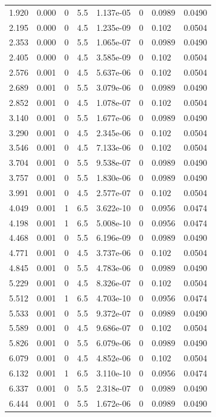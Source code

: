 \documentclass[preview]{standalone}
\begin{document}
{{\begin{tabular}{L{1.2cm}C{1.2cm} C{0.3cm}C{0.5cm} C{1.4cm}C{1.4cm} C{1.4cm}C{1.4cm}}
  1.920  &  0.000  & 0     & 5.5 &  1.137e-05  & 0  & 0.0989 &  0.0490   \\ 
  2.195  &  0.000  & 0     & 4.5 &  1.235e-09  & 0  & 0.102 &  0.0504   \\ 
  2.353  &  0.000  & 0     & 5.5 &  1.065e-07  & 0  & 0.0989 &  0.0490   \\ 
  2.405  &  0.000  & 0     & 4.5 &  3.585e-09  & 0  & 0.102 &  0.0504   \\ 
  2.576  &  0.001  & 0     & 4.5 &  5.637e-06  & 0  & 0.102 &  0.0504   \\ 
  2.689  &  0.001  & 0     & 5.5 &  3.079e-06  & 0  & 0.0989 &  0.0490   \\ 
  2.852  &  0.001  & 0     & 4.5 &  1.078e-07  & 0  & 0.102 &  0.0504   \\ 
  3.140  &  0.001  & 0     & 5.5 &  1.677e-06  & 0  & 0.0989 &  0.0490   \\ 
  3.290  &  0.001  & 0     & 4.5 &  2.345e-06  & 0  & 0.102 &  0.0504   \\ 
  3.546  &  0.001  & 0     & 4.5 &  7.133e-06  & 0  & 0.102 &  0.0504   \\ 
  3.704  &  0.001  & 0     & 5.5 &  9.538e-07  & 0  & 0.0989 &  0.0490   \\ 
  3.757  &  0.001  & 0     & 5.5 &  1.830e-06  & 0  & 0.0989 &  0.0490   \\ 
  3.991  &  0.001  & 0     & 4.5 &  2.577e-07  & 0  & 0.102 &  0.0504   \\ 
  4.049  &  0.001  & 1     & 6.5 &  3.622e-10  & 0  & 0.0956 &  0.0474   \\ 
  4.198  &  0.001  & 1     & 6.5 &  5.008e-10  & 0  & 0.0956 &  0.0474   \\ 
  4.468  &  0.001  & 0     & 5.5 &  6.196e-09  & 0  & 0.0989 &  0.0490   \\ 
  4.771  &  0.001  & 0     & 4.5 &  3.737e-06  & 0  & 0.102 &  0.0504   \\ 
  4.845  &  0.001  & 0     & 5.5 &  4.783e-06  & 0  & 0.0989 &  0.0490   \\ 
  5.229  &  0.001  & 0     & 4.5 &  8.326e-07  & 0  & 0.102 &  0.0504   \\ 
  5.512  &  0.001  & 1     & 6.5 &  4.703e-10  & 0  & 0.0956 &  0.0474   \\ 
  5.533  &  0.001  & 0     & 5.5 &  9.372e-07  & 0  & 0.0989 &  0.0490   \\ 
  5.589  &  0.001  & 0     & 4.5 &  9.686e-07  & 0  & 0.102 &  0.0504   \\ 
  5.826  &  0.001  & 0     & 5.5 &  6.079e-06  & 0  & 0.0989 &  0.0490   \\ 
  6.079  &  0.001  & 0     & 4.5 &  4.852e-06  & 0  & 0.102 &  0.0504   \\ 
  6.132  &  0.001  & 1     & 6.5 &  3.110e-10  & 0  & 0.0956 &  0.0474   \\ 
  6.337  &  0.001  & 0     & 5.5 &  2.318e-07  & 0  & 0.0989 &  0.0490   \\ 
  6.444  &  0.001  & 0     & 5.5 &  1.672e-06  & 0  & 0.0989 &  0.0490   \\ 
\hline 
\end{tabular} 

}}
\end{document}
